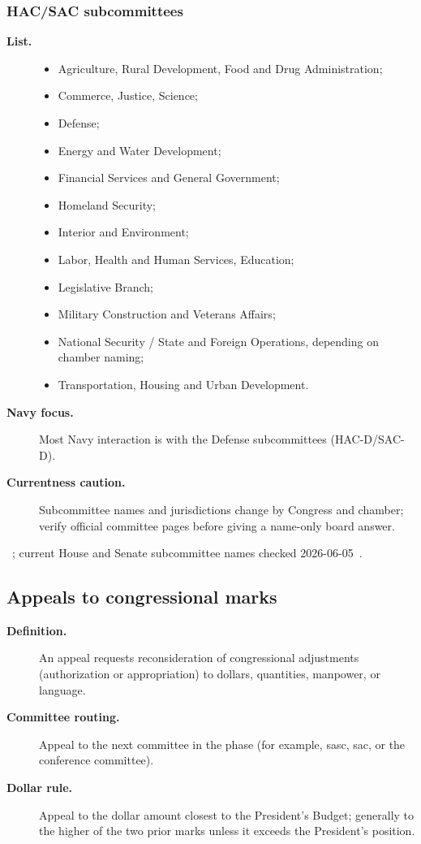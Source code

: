 \documentclass[../main.tex]{subfiles}
\begin{document}
\subsubsection{HAC/SAC subcommittees}
\begin{description}
  \item[\textbf{List.}]
        \begin{itemize}
          \item Agriculture, Rural Development, Food and Drug Administration;
          \item Commerce, Justice, Science;
          \item Defense;
          \item Energy and Water Development;
          \item Financial Services and General Government;
          \item Homeland Security;
          \item Interior and Environment;
          \item Labor, Health and Human Services, Education;
          \item Legislative Branch;
          \item Military Construction and Veterans Affairs;
          \item National Security / State and Foreign Operations, depending on chamber naming;
          \item Transportation, Housing and Urban Development.
        \end{itemize}
  \item[\textbf{Navy focus.}] Most Navy interaction is with the Defense subcommittees (HAC-D/SAC-D).
  \item[\textbf{Currentness caution.}] Subcommittee names and jurisdictions change by Congress and chamber; verify
  official committee pages before giving a name-only board answer.
\end{description}
~; current House and Senate subcommittee names checked 2026-06-05~\autocite{HAC-Subcommittees-2026,SAC-Subcommittees-2026}.

\subsection{Appeals to congressional marks}
\begin{description}
  \item[\textbf{Definition.}] An appeal requests reconsideration of congressional adjustments (authorization or appropriation) to dollars, quantities, manpower, or language.
  \item[\textbf{Committee routing.}] Appeal to the next committee in the phase (for example, \ac{sasc}, \ac{sac}, or the conference committee).
  \item[\textbf{Dollar rule.}] Appeal to the dollar amount closest to the President's Budget; generally to the higher of the two prior marks unless it exceeds the President's position.
\end{description}
~
\end{document}

